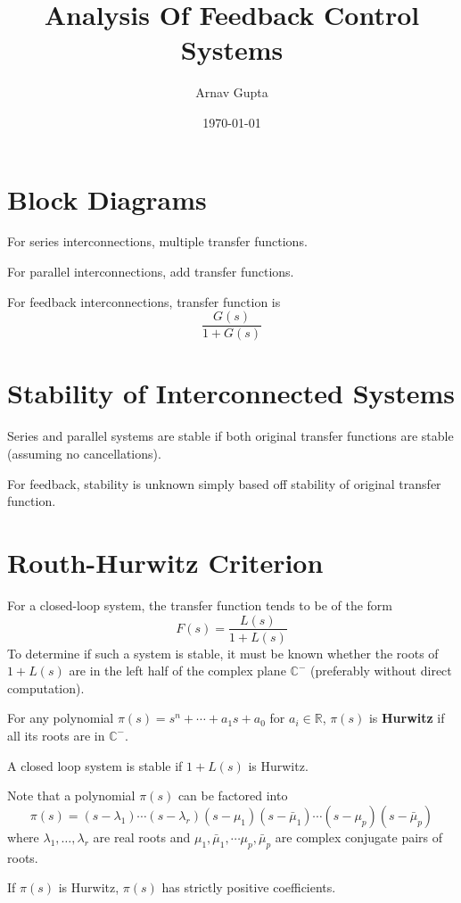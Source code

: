\documentclass[11pt]{article}
\author{Arnav Gupta}
\date{\today}
\title{Analysis Of Feedback Control Systems}
\begin{document}
\maketitle
\tableofcontents

\section{Block Diagrams}
\label{sec:org05f6f5f}
For series interconnections, multiple transfer functions.

For parallel interconnections, add transfer functions.

For feedback interconnections, transfer function is
$$ \frac{G(s)}{1 + G(s)} $$
\section{Stability of Interconnected Systems}
\label{sec:orgfa9694a}
Series and parallel systems are stable if both original transfer functions are stable
(assuming no cancellations).

For feedback, stability is unknown simply based off stability of original transfer
function.
\section{Routh-Hurwitz Criterion}
\label{sec:org5ff03d6}
For a closed-loop system, the transfer function tends to be of the form
$$ F(s) = \frac{L(s)}{1 + L(s)} $$
To determine if such a system is stable, it must be known whether
the roots of \(1+L(s)\) are in the left half of the complex plane
\(\mathbb{C}^{-}\) (preferably without direct computation).

For any polynomial \(\pi(s) = s^{n} + \cdots + a_{1}s + a_{0}\) for
\(a_{i} \in \mathbb{R}\),
\(\pi(s)\) is \textbf{Hurwitz} if all its roots are in \(\mathbb{C}^{-}\).

A closed loop system is stable if \(1 + L(s)\) is Hurwitz.

Note that a polynomial \(\pi(s)\) can be factored into
$$ \pi(s) = (s - \lambda_{1})\cdots (s - \lambda_{r}) (s - \mu_{1})(s - \bar{\mu}_{1}) \cdots (s - \mu_{p})(s - \bar{\mu}_{p}) $$
where \(\lambda_{1}, \dots, \lambda_{r}\) are real roots and \(\mu_{1}, \bar{\mu}_{1}, \cdots \mu_{p}, \bar{\mu}_{p}\) are complex conjugate pairs of roots.

If \(\pi(s)\) is Hurwitz, \(\pi(s)\) has strictly positive coefficients.
\end{document}
